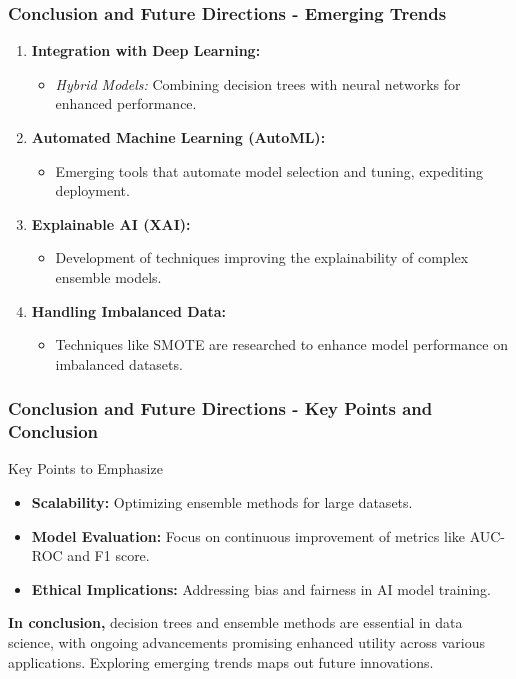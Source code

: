 \documentclass[aspectratio=169]{beamer}
\begin{document}
\begin{frame}[fragile]
    \frametitle{Conclusion and Future Directions - Emerging Trends}
    \begin{enumerate}
        \item \textbf{Integration with Deep Learning:}
        \begin{itemize}
            \item \textit{Hybrid Models:} Combining decision trees with neural networks for enhanced performance.
        \end{itemize}

        \item \textbf{Automated Machine Learning (AutoML):}
        \begin{itemize}
            \item Emerging tools that automate model selection and tuning, expediting deployment.
        \end{itemize}

        \item \textbf{Explainable AI (XAI):}
        \begin{itemize}
            \item Development of techniques improving the explainability of complex ensemble models.
        \end{itemize}

        \item \textbf{Handling Imbalanced Data:}
        \begin{itemize}
            \item Techniques like SMOTE are researched to enhance model performance on imbalanced datasets.
        \end{itemize}
    \end{enumerate}
\end{frame}

\begin{frame}[fragile]
    \frametitle{Conclusion and Future Directions - Key Points and Conclusion}
    \begin{block}{Key Points to Emphasize}
        \begin{itemize}
            \item \textbf{Scalability:} Optimizing ensemble methods for large datasets.
            \item \textbf{Model Evaluation:} Focus on continuous improvement of metrics like AUC-ROC and F1 score.
            \item \textbf{Ethical Implications:} Addressing bias and fairness in AI model training.
        \end{itemize}
    \end{block}

    \textbf{In conclusion,} decision trees and ensemble methods are essential in data science, with ongoing advancements promising enhanced utility across various applications. Exploring emerging trends maps out future innovations.
\end{frame}
\end{document}
